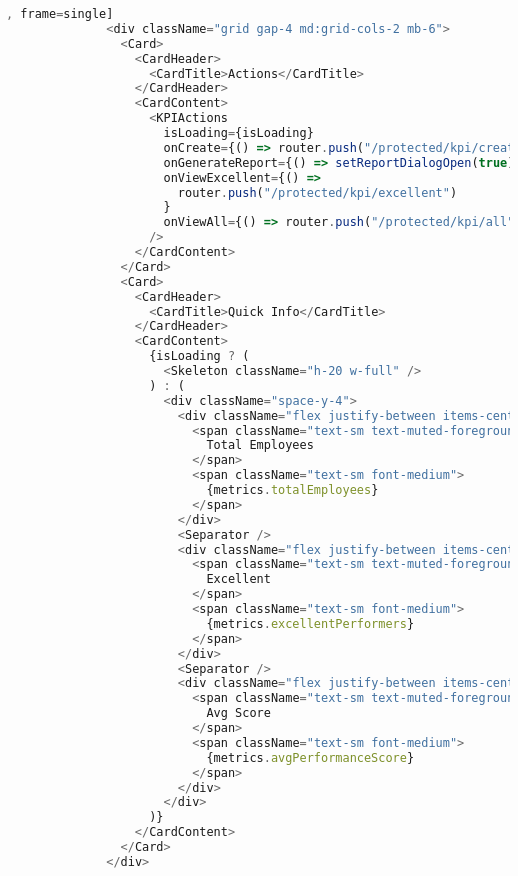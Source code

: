 \begin{lstlisting}[language=Typescript, caption=src/app/protected/kpi/page.tsx [front-end], frame=single]
              <div className="grid gap-4 md:grid-cols-2 mb-6">
                <Card>
                  <CardHeader>
                    <CardTitle>Actions</CardTitle>
                  </CardHeader>
                  <CardContent>
                    <KPIActions
                      isLoading={isLoading}
                      onCreate={() => router.push("/protected/kpi/create")}
                      onGenerateReport={() => setReportDialogOpen(true)}
                      onViewExcellent={() =>
                        router.push("/protected/kpi/excellent")
                      }
                      onViewAll={() => router.push("/protected/kpi/all")}
                    />
                  </CardContent>
                </Card>
                <Card>
                  <CardHeader>
                    <CardTitle>Quick Info</CardTitle>
                  </CardHeader>
                  <CardContent>
                    {isLoading ? (
                      <Skeleton className="h-20 w-full" />
                    ) : (
                      <div className="space-y-4">
                        <div className="flex justify-between items-center">
                          <span className="text-sm text-muted-foreground">
                            Total Employees
                          </span>
                          <span className="text-sm font-medium">
                            {metrics.totalEmployees}
                          </span>
                        </div>
                        <Separator />
                        <div className="flex justify-between items-center">
                          <span className="text-sm text-muted-foreground">
                            Excellent
                          </span>
                          <span className="text-sm font-medium">
                            {metrics.excellentPerformers}
                          </span>
                        </div>
                        <Separator />
                        <div className="flex justify-between items-center">
                          <span className="text-sm text-muted-foreground">
                            Avg Score
                          </span>
                          <span className="text-sm font-medium">
                            {metrics.avgPerformanceScore}
                          </span>
                        </div>
                      </div>
                    )}
                  </CardContent>
                </Card>
              </div>
    

\end{lstlisting}
